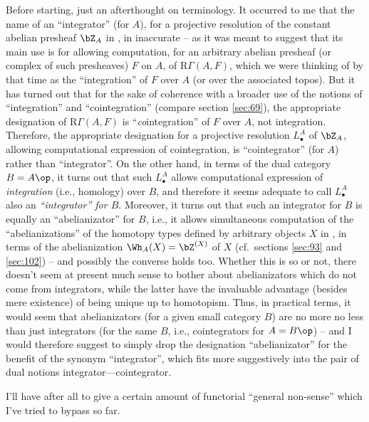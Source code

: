 Before starting, just an afterthought on terminology. It occurred to
me that the name of an ``integrator'' (for $A$), for a projective
resolution of the constant abelian presheaf $\bZ_A$ in \Ahatab, in
inaccurate -- as it was meant to suggest that its main use is for
allowing computation, for an arbitrary abelian presheaf (or complex of
such presheaves) $F$ on $A$, of $\mathrm R\Gamma(A,F)$, which we were
thinking of by that time as the ``integration'' of $F$ over $A$ (or
over the associated topos). But it has turned out that for the sake of
coherence with a broader use of the notions of ``integration'' and
``cointegration'' (compare section \ref{sec:69}), the appropriate
designation of $\mathrm R\Gamma(A,F)$ is ``\emph{co}integration'' of
$F$ over $A$, not integration. Therefore, the appropriate designation
for a projective resolution $L_\bullet^A$ of $\bZ_A$, allowing
computational expression of cointegration, is ``cointegrator'' (for
$A$) rather than ``integrator''. On the other hand, in terms of the
dual category $B=A\op$, it turns out that such $L_\bullet^A$ allows
computational expression of \emph{integration} (i.e., homology) over
$B$, and therefore it seems adequate to call $L_\bullet^A$ also an
\emph{``integrator'' for $B$}. Moreover, it turns out that such an
integrator for $B$ is equally an ``abelianizator'' for $B$, i.e., it
allows simultaneous computation of the ``abelianizations'' of the
homotopy types defined by arbitrary objects $X$ in \Ahat, in terms of
the abelianization $\Wh_A(X)=\bZ^{(X)}$ of $X$ (cf.\ sections
\ref{sec:93} and \ref{sec:102}) -- and possibly the converse holds
too. Whether this is so or not, there doesn't seem at present much
sense to bother about abelianizators which do not come from
integrators, while the latter have the invaluable advantage (besides
mere existence) of being unique up to homotopism. Thus, in practical
terms, it would seem that abelianizators (for a given small category
$B$) are no more no less than just integrators (for the same $B$,
i.e., cointegrators for $A=B\op$) -- and I would therefore suggest to
simply drop the designation ``abelianizator'' for the benefit of the
synonym ``integrator'', which fits more suggestively into the pair of
dual notions integrator---cointegrator.

\label{sec:104}%
I'll have after all to give a certain amount of functorial ``general
non-sense'' which I've tried to bypass so far.

